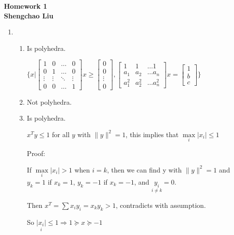 \documentclass[12pt]{article}
\begin{document}
\begin{center} {\Large
{\bf Homework 1\\Shengchao Liu}}
\end{center}

\begin{enumerate}

\item

\begin{enumerate}
\item
Is polyhedra.

$ \{ x | \begin{bmatrix} 1 & 0 & \hdots & 0 \\ 0 & 1 & \hdots & 0 \\ \vdots & \vdots & \ddots & \vdots \\ 0 & 0 & \hdots & 1 \end{bmatrix} x \ge \begin{bmatrix} 0 \\ 0 \\ \vdots \\ 0\end{bmatrix},
\begin{bmatrix} 1 & 1 & \hdots 1 \\ a_1 & a_2 & \hdots a_n \\ a_1^2 & a_2^2 & \hdots a_n^2 \end{bmatrix} x = \begin{bmatrix} 1 \\ b \\ c \end{bmatrix} \}$

\item
Not polyhedra.

\item
Is polyhedra.

$x^T y \le 1$ for all $y$ with $\|y\|^2=1$, this implies that $\underset{i}{\max} |x_i| \le 1$

Proof:

If $\underset{i}{\max} |x_i| > 1$ when $i=k$, then we can find y with $\|y\|^2=1$ and $y_k=1$ if $ x_k=1 $, $y_k=-1$ if $ x_k=-1 $, and $\underset{i \ne k}{y_i} = 0$.

Then $x^T = \sum x_i y_i = x_k y_k > 1$, contradicts with assumption.

So $\underset{i}{|x_i|} \le 1 \Longrightarrow 1 \succeq x \succeq -1$


\end{enumerate}
\end{enumerate}
\end{document}
